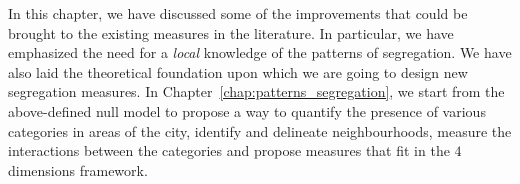\bigskip

In this chapter, we have discussed some of the improvements that could be
brought to the existing measures in the literature. In particular, we have
emphasized the need for a \emph{local} knowledge of the patterns of segregation.
We have also laid the theoretical foundation upon which we are going to design
new segregation measures.
In Chapter~\ref{chap:patterns_segregation}, we start from the above-defined null
model to propose a way to quantify the presence of various categories in areas
of the city, identify and delineate neighbourhoods, measure the interactions
between the categories and propose measures that fit in the $4$ dimensions
framework.
